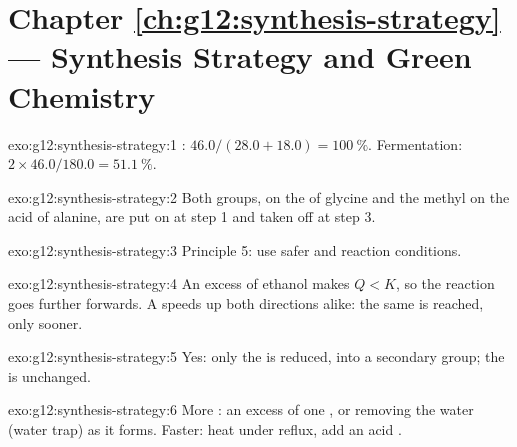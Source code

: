 \section*{Chapter \ref{ch:g12:synthesis-strategy} --- Synthesis Strategy and Green Chemistry}

\begin{solution}{exo:g12:synthesis-strategy:1}
: $46.0/(28.0 + 18.0) = \qty{100}{\percent}$. Fermentation:
$2 \times 46.0/180.0 = \qty{51.1}{\percent}$.
\end{solution}

\begin{solution}{exo:g12:synthesis-strategy:2}
Both groups,  on the  of glycine and the methyl  on the acid
of alanine, are put on at step 1 and taken off at step 3.
\end{solution}

\begin{solution}{exo:g12:synthesis-strategy:3}
Principle 5: use safer  and reaction conditions.
\end{solution}

\begin{solution}{exo:g12:synthesis-strategy:4}
An excess of ethanol makes $Q < K$, so the reaction goes further
forwards. A  speeds up both directions alike: the same  is reached, only sooner.
\end{solution}

\begin{solution}{exo:g12:synthesis-strategy:5}
Yes: only the  is reduced, into a secondary  group; the
 is unchanged.
\end{solution}

\begin{solution}{exo:g12:synthesis-strategy:6}
More : an excess of one , or removing the water (water trap)
as it forms. Faster: heat under reflux, add an acid .
\end{solution}

